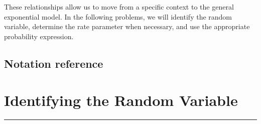These relationships allow us to move from a specific context to the general
exponential model. In the following problems, we will identify the random
variable, determine the rate parameter when necessary, and use the appropriate
probability expression.


\subsection*{Notation reference}
\label{tone:C4:reference}
\section{Identifying the Random Variable}\label{sec:c4-identifying-variable}
	
	\vspace{5mm}

\noindent\rule{\textwidth}{0.4pt}

